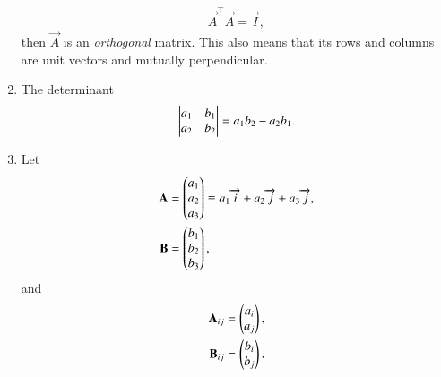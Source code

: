 \begin{enumerate}[label=\thesubsection.\arabic*.,ref=\thesubsection.\theenumi]
\begin{align}
	\vec{A}^{\top}\vec{A} =\vec{I},
\label{eq:12/10/3/5/inner}
\end{align}
		then $	\vec{A}$ is an {\em orthogonal} matrix.  This also means that its rows and columns are unit vectors and mutually perpendicular.
	\item The determinant
\begin{align}
  \label{eq:det-2d}
	\begin{vmatrix}a_1 & b_1 \\ a_2 & b_2\end{vmatrix} = a_1 b_2 - a_2 b_1.
\end{align}
\item Let 
\begin{align}
  \mathbf{A} &= \begin{pmatrix}a_1\\a_2 \\ a_3\end{pmatrix} \equiv a_1\overrightarrow{i}+a_2\overrightarrow{j}+a_3\overrightarrow{j}, 
  \\
  \mathbf{B} &= \begin{pmatrix}b_1\\b_2 \\ b_3\end{pmatrix}, 
\end{align}
and 
\begin{align}
  \label{eq:cross3d-submat}
\begin{split}
  \mathbf{A}_{ij} &= \begin{pmatrix}a_i\\a_j\end{pmatrix}, 
  \\
  \mathbf{B}_{ij} &= \begin{pmatrix}b_i\\b_j\end{pmatrix}. 
\end{split}
\end{align}


\end{enumerate}
